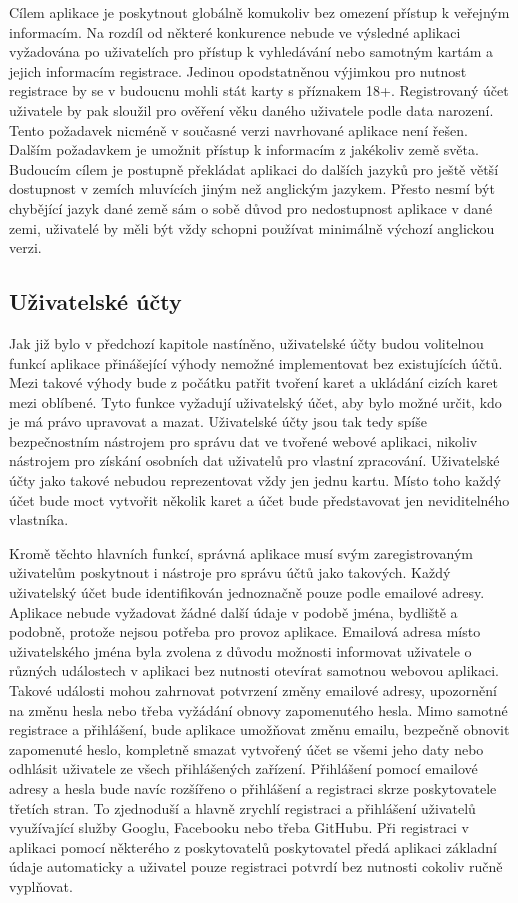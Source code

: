 	Cílem aplikace je poskytnout globálně komukoliv bez omezení přístup k veřejným informacím.
	Na rozdíl od některé konkurence nebude ve výsledné aplikaci vyžadována po uživatelích pro přístup k vyhledávání
	nebo samotným kartám a jejich informacím registrace.
	Jedinou opodstatněnou výjimkou pro nutnost registrace by se v budoucnu mohli stát karty s příznakem 18+.
	Registrovaný účet uživatele by pak sloužil pro ověření věku daného uživatele podle data narození.
	Tento požadavek nicméně v současné verzi navrhované aplikace není řešen.
	Dalším požadavkem je umožnit přístup k informacím z jakékoliv země světa.
	Budoucím cílem je postupně překládat aplikaci do dalších jazyků pro ještě větší dostupnost v zemích mluvících
	jiným než anglickým jazykem.
	Přesto nesmí být chybějící jazyk dané země sám o sobě důvod pro nedostupnost aplikace v dané zemi, uživatelé by
	měli být vždy schopni používat minimálně výchozí anglickou verzi.

	\subsection{Uživatelské účty}

	Jak již bylo v předchozí kapitole nastíněno, uživatelské účty budou volitelnou funkcí aplikace přinášející výhody
	nemožné implementovat bez existujících účtů.
	Mezi takové výhody bude z počátku patřit tvoření karet a ukládání cizích karet mezi oblíbené.
	Tyto funkce vyžadují uživatelský účet, aby bylo možné určit, kdo je má právo upravovat a mazat.
	Uživatelské účty jsou tak tedy spíše bezpečnostním nástrojem pro správu dat ve tvořené webové aplikaci, nikoliv
	nástrojem pro získání osobních dat uživatelů pro vlastní zpracování.
	Uživatelské účty jako takové nebudou reprezentovat vždy jen jednu kartu.
	Místo toho každý účet bude moct vytvořit několik karet a účet bude představovat jen neviditelného vlastníka.

	Kromě těchto hlavních funkcí, správná aplikace musí svým zaregistrovaným uživatelům poskytnout
	i nástroje pro správu účtů jako takových.
	Každý uživatelský účet bude identifikován jednoznačně pouze podle emailové adresy.
	Aplikace nebude vyžadovat žádné další údaje v podobě jména, bydliště a podobně, protože nejsou potřeba pro
	provoz aplikace.
	Emailová adresa místo uživatelského jména byla zvolena z důvodu možnosti informovat uživatele o různých událostech
	v aplikaci bez nutnosti otevírat samotnou webovou aplikaci.
	Takové události mohou zahrnovat potvrzení změny emailové adresy, upozornění na změnu hesla nebo třeba vyžádání obnovy
	zapomenutého hesla.
	Mimo samotné registrace a přihlášení, bude aplikace umožňovat změnu emailu, bezpečně obnovit zapomenuté heslo, kompletně
	smazat vytvořený účet se všemi jeho daty nebo odhlásit uživatele ze všech přihlášených zařízení.
	Přihlášení pomocí emailové adresy a hesla bude navíc rozšířeno o přihlášení a registraci skrze poskytovatele třetích stran.
	To zjednoduší a hlavně zrychlí registraci a přihlášení uživatelů využívající služby Googlu, Facebooku nebo třeba
	GitHubu.
	Při registraci v aplikaci pomocí některého z poskytovatelů poskytovatel předá aplikaci základní údaje automaticky
	a uživatel pouze registraci potvrdí bez nutnosti cokoliv ručně vyplňovat.

